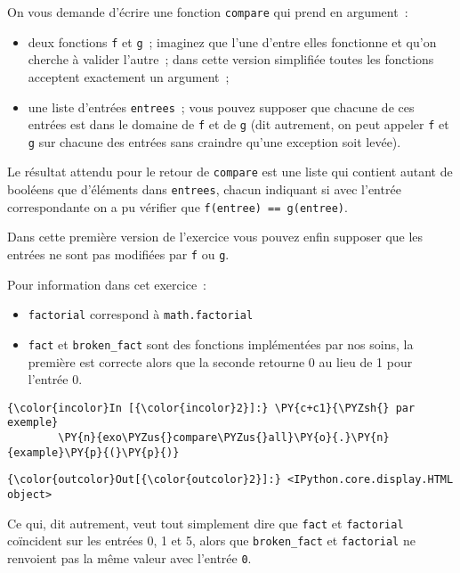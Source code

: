     On vous demande d'écrire une fonction \texttt{compare} qui prend en
argument~:

\begin{itemize}
\tightlist
\item
  deux fonctions \texttt{f} et \texttt{g}~; imaginez que l'une d'entre
  elles fonctionne et qu'on cherche à valider l'autre~; dans cette
  version simplifiée toutes les fonctions acceptent exactement un
  argument~;
\item
  une liste d'entrées \texttt{entrees}~; vous pouvez supposer que
  chacune de ces entrées est dans le domaine de \texttt{f} et de
  \texttt{g} (dit autrement, on peut appeler \texttt{f} et \texttt{g}
  sur chacune des entrées sans craindre qu'une exception soit levée).
\end{itemize}

Le résultat attendu pour le retour de \texttt{compare} est une liste qui
contient autant de booléens que d'éléments dans \texttt{entrees}, chacun
indiquant si avec l'entrée correspondante on a pu vérifier que
\texttt{f(entree)\ ==\ g(entree)}.

Dans cette première version de l'exercice vous pouvez enfin supposer que
les entrées ne sont pas modifiées par \texttt{f} ou \texttt{g}.

    Pour information dans cet exercice~:

\begin{itemize}
\tightlist
\item
  \texttt{factorial} correspond à \texttt{math.factorial}
\item
  \texttt{fact} et \texttt{broken\_fact} sont des fonctions implémentées
  par nos soins, la première est correcte alors que la seconde retourne
  0 au lieu de 1 pour l'entrée 0.
\end{itemize}

    \begin{Verbatim}[commandchars=\\\{\}]
{\color{incolor}In [{\color{incolor}2}]:} \PY{c+c1}{\PYZsh{} par exemple}
        \PY{n}{exo\PYZus{}compare\PYZus{}all}\PY{o}{.}\PY{n}{example}\PY{p}{(}\PY{p}{)}
\end{Verbatim}


\begin{Verbatim}[commandchars=\\\{\}]
{\color{outcolor}Out[{\color{outcolor}2}]:} <IPython.core.display.HTML object>
\end{Verbatim}
            
    Ce qui, dit autrement, veut tout simplement dire que \texttt{fact} et
\texttt{factorial} coïncident sur les entrées 0, 1 et 5, alors que
\texttt{broken\_fact} et \texttt{factorial} ne renvoient pas la même
valeur avec l'entrée \texttt{0}.

